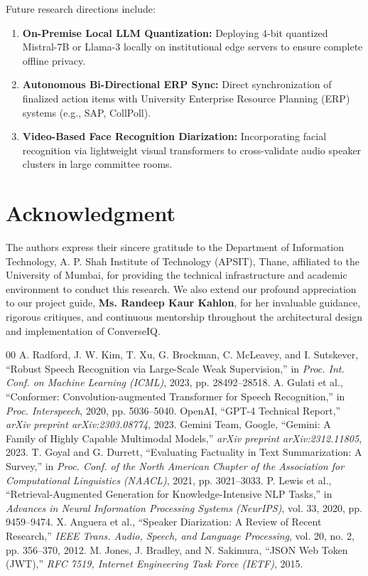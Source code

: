 \documentclass[conference]{IEEEtran}
\begin{document}
Future research directions include:
\begin{enumerate}
    \item \textbf{On-Premise Local LLM Quantization:} Deploying 4-bit quantized Mistral-7B or Llama-3 locally on institutional edge servers to ensure complete offline privacy.
    \item \textbf{Autonomous Bi-Directional ERP Sync:} Direct synchronization of finalized action items with University Enterprise Resource Planning (ERP) systems (e.g., SAP, CollPoll).
    \item \textbf{Video-Based Face Recognition Diarization:} Incorporating facial recognition via lightweight visual transformers to cross-validate audio speaker clusters in large committee rooms.
\end{enumerate}

\section*{Acknowledgment}
The authors express their sincere gratitude to the Department of Information Technology, A. P. Shah Institute of Technology (APSIT), Thane, affiliated to the University of Mumbai, for providing the technical infrastructure and academic environment to conduct this research. We also extend our profound appreciation to our project guide, \textbf{Ms. Randeep Kaur Kahlon}, for her invaluable guidance, rigorous critiques, and continuous mentorship throughout the architectural design and implementation of ConverseIQ.

\begin{thebibliography}{00}
 A. Radford, J. W. Kim, T. Xu, G. Brockman, C. McLeavey, and I. Sutskever, ``Robust Speech Recognition via Large-Scale Weak Supervision,'' in \textit{Proc. Int. Conf. on Machine Learning (ICML)}, 2023, pp. 28492--28518.
 A. Gulati et al., ``Conformer: Convolution-augmented Transformer for Speech Recognition,'' in \textit{Proc. Interspeech}, 2020, pp. 5036--5040.
 OpenAI, ``GPT-4 Technical Report,'' \textit{arXiv preprint arXiv:2303.08774}, 2023.
 Gemini Team, Google, ``Gemini: A Family of Highly Capable Multimodal Models,'' \textit{arXiv preprint arXiv:2312.11805}, 2023.
 T. Goyal and G. Durrett, ``Evaluating Factuality in Text Summarization: A Survey,'' in \textit{Proc. Conf. of the North American Chapter of the Association for Computational Linguistics (NAACL)}, 2021, pp. 3021--3033.
 P. Lewis et al., ``Retrieval-Augmented Generation for Knowledge-Intensive NLP Tasks,'' in \textit{Advances in Neural Information Processing Systems (NeurIPS)}, vol. 33, 2020, pp. 9459--9474.
 X. Anguera et al., ``Speaker Diarization: A Review of Recent Research,'' \textit{IEEE Trans. Audio, Speech, and Language Processing}, vol. 20, no. 2, pp. 356--370, 2012.
 M. Jones, J. Bradley, and N. Sakimura, ``JSON Web Token (JWT),'' \textit{RFC 7519, Internet Engineering Task Force (IETF)}, 2015.
\end{thebibliography}
\end{document}
